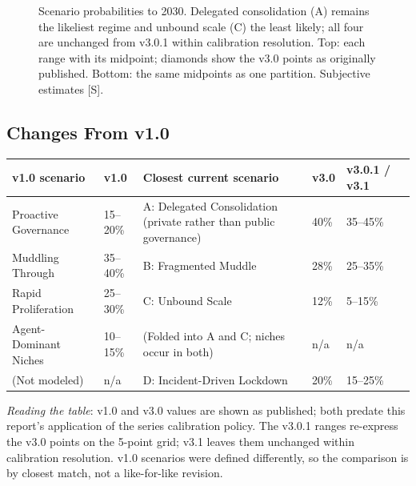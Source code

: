 \documentclass[11pt,letterpaper]{article}
\begin{document}
\begin{figure}[!htbp]
\caption{Scenario probabilities to 2030. Delegated consolidation (A) remains the likeliest regime and unbound scale (C) the least likely; all four are unchanged from v3.0.1 within calibration resolution. Top: each range with its midpoint; diamonds show the v3.0 points as originally published. Bottom: the same midpoints as one partition. Subjective estimates [S].}
\label{fig:scenarios}
\end{figure}

\subsection{Changes From v1.0}

\begin{center}
\small
\begin{tabularx}{\linewidth}{ZY{1.25}Y{0.6}Y{1.5}Y{0.7}Y{0.95}}
\toprule
\textbf{v1.0 scenario} & \textbf{v1.0} & \textbf{Closest current scenario} & \textbf{v3.0} & \textbf{v3.0.1 / v3.1} \\
\midrule
Proactive Governance & 15--20\% & A: Delegated Consolidation (private rather than public governance) & 40\% & 35--45\% \\
Muddling Through & 35--40\% & B: Fragmented Muddle & 28\% & 25--35\% \\
Rapid Proliferation & 25--30\% & C: Unbound Scale & 12\% & 5--15\% \\
Agent-Dominant Niches & 10--15\% & (Folded into A and C; niches occur in both) & n/a & n/a \\
(Not modeled) & n/a & D: Incident-Driven Lockdown & 20\% & 15--25\% \\
\bottomrule
\end{tabularx}
\end{center}

\textit{Reading the table}: v1.0 and v3.0 values are shown as published; both predate this report's application of the series calibration policy. The v3.0.1 ranges re-express the v3.0 points on the 5-point grid; v3.1 leaves them unchanged within calibration resolution. v1.0 scenarios were defined differently, so the comparison is by closest match, not a like-for-like revision.
\end{document}
